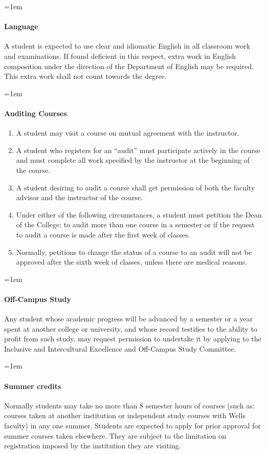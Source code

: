 \documentclass{manual}
\newcommand{\modified}[1]{}
\let\oldparagraph\paragraph
\renewcommand\paragraph{\leftskip=1em\oldparagraph}
\newcommand{\itemLevelA}{\alph*.}
\newcommand{\itemRefA}{\alph*}
\begin{document}
\paragraph{Language}
 A student is expected to use clear and idiomatic English in all classroom work and examinations. If found deficient in this respect,  extra work in English composition under the direction of the Department of English may be required. This extra work shall not count towards the degree.

\paragraph{Auditing Courses}
\begin{enumerate}[label=\itemLevelA,ref=\itemRefA]
\item A student may visit a course on mutual agreement with the instructor. 
\item A student who registers for an ``audit'' must participate actively in the course and must complete all work specified  by the instructor at the beginning of the course.
\item  A student desiring to audit a course shall get permission of both the faculty advisor and the instructor of the course.
\item Under either of the following circumstances, a student must petition the Dean of the College:  to audit more than one course in a semester or if the request to audit a course is made after the first week of classes. 
\item Normally, petitions to change the status of a course to an audit will not be approved after the sixth week of classes, unless there are medical reasons.
\end{enumerate}

\paragraph{Off-Campus Study}
 Any student whose academic progress will be advanced by a semester or a year spent at another college or university, and whose record testifies to the ability to profit from such study, may request permission to undertake it by applying to the Inclusive and Intercultural Excellence and Off-Campus Study Committee.

\paragraph{Summer credits}
Normally students may take no more than 8 semester hours of courses (such as: courses taken at another institution or independent study courses with Wells faculty) in any one summer. Students are expected to apply for prior approval for summer courses taken elsewhere. They are subject to the limitation on registration imposed by the institution they are visiting.\modified{5/13/93}
\end{document}
